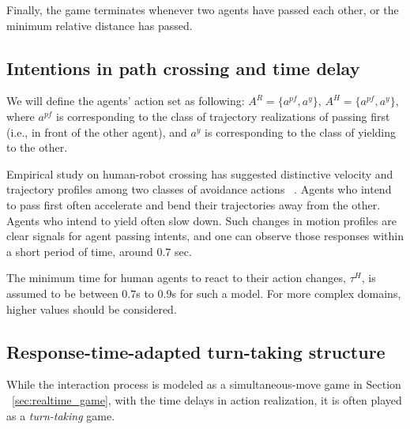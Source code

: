 \documentclass[letterpaper, 10 pt, conference]{ieeeconf}  %
\begin{document}
Finally, the game terminates whenever two agents have passed each other, or the minimum relative distance has passed.

\subsection{Intentions in path crossing and time delay}

We will define the agents' action set as following: $A^R = \{a^{pf}, a^y\}$, $A^H = \{a^{pf},a^y\}$, where $a^{pf}$ is corresponding to the class of trajectory realizations of passing first (i.e., in front of the other agent), and $a^y$ is corresponding to the class of yielding to the other. 

Empirical study on human-robot crossing has suggested distinctive velocity and trajectory profiles among two classes of avoidance actions ~\cite{paris2007pedestrian}. Agents who intend to pass first often accelerate and bend their trajectories away from the other. Agents who intend to yield often slow down. Such changes in motion profiles are clear signals for agent passing intents, and one can observe those responses within a short period of time, around $0.7$ sec.


The minimum time for human agents to react to their action changes, $\tau^H$, is assumed to be between $0.7$s to $0.9$s for such a model. For more complex domains, higher values should be considered.

\subsection{Response-time-adapted turn-taking structure}
While the interaction process is modeled as a simultaneous-move game in Section ~\ref{sec:realtime_game}, with the time delays in action realization, it is often played as a \textit{turn-taking} game. 
\end{document}
